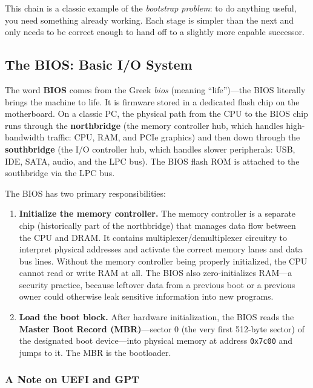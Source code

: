 \documentclass[11pt]{article}
\begin{document}
This chain is a classic example of the \emph{bootstrap problem}: to do anything useful, you need something already working. Each stage is simpler than the next and only needs to be correct enough to hand off to a slightly more capable successor.

\subsection{The BIOS: Basic I/O System}

The word \textbf{BIOS} comes from the Greek \textit{bios} (meaning ``life'')---the BIOS literally brings the machine to life. It is firmware stored in a dedicated flash chip on the motherboard. On a classic PC, the physical path from the CPU to the BIOS chip runs through the \textbf{northbridge} (the memory controller hub, which handles high-bandwidth traffic: CPU, RAM, and PCIe graphics) and then down through the \textbf{southbridge} (the I/O controller hub, which handles slower peripherals: USB, IDE, SATA, audio, and the LPC bus). The BIOS flash ROM is attached to the southbridge via the LPC bus.

The BIOS has two primary responsibilities:

\begin{enumerate}
    \item \textbf{Initialize the memory controller.} The memory controller is a separate chip (historically part of the northbridge) that manages data flow between the CPU and DRAM. It contains multiplexer/demultiplexer circuitry to interpret physical addresses and activate the correct memory lanes and data bus lines. Without the memory controller being properly initialized, the CPU cannot read or write RAM at all. The BIOS also zero-initializes RAM---a security practice, because leftover data from a previous boot or a previous owner could otherwise leak sensitive information into new programs.

    \item \textbf{Load the boot block.} After hardware initialization, the BIOS reads the \textbf{Master Boot Record (MBR)}---sector 0 (the very first 512-byte sector) of the designated boot device---into physical memory at address \texttt{0x7c00} and jumps to it. The MBR is the bootloader.
\end{enumerate}

\subsubsection*{A Note on UEFI and GPT}
\end{document}
